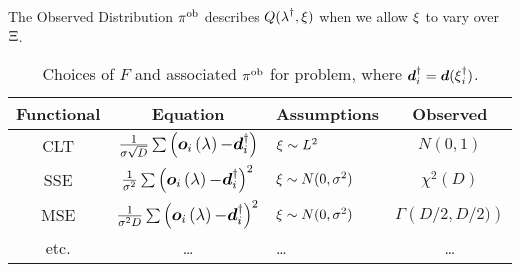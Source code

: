 \begin{block}{The Observed Distribution}
\centering
\Large
    $\operatorname*{\pi^{ob}}$ describes $Q(\operatorname*{\lambda}^\dagger, \operatorname*{\xi})$ when we allow $\operatorname*{\xi}$ to vary over $\operatorname*{\Xi}$.
\vspace{1cm}
    \begin{table}
      \centering
      \begin{tabular}{c c l c}
        \textbf{Functional} & \textbf{Equation} & \textbf{Assumptions} & \bf{Observed} \\
        \midrule
        CLT & $\frac{1}{\sigma\sqrt{D}} \large\sum \left( \boldsymbol{o}_i\operatorname*{\left ( \operatorname*{\lambda} \right )} - \boldsymbol{d}_i^\dagger \right)$ & $\operatorname*{\xi} \sim L^2$ & $N(0,1)$ \\
        SSE &  $\frac{1}{\sigma^2} \large\sum \left ( \boldsymbol{o}_i\operatorname*{\left ( \operatorname*{\lambda} \right )} - \boldsymbol{d}_i^\dagger \right)^2$ & $\operatorname*{\xi} \sim N(0,\sigma^2)$ & $\chi^2 (D)$ \\
        MSE & $\frac{1}{\sigma^2 D} \large\sum \left ( \boldsymbol{o}_i\operatorname*{\left ( \operatorname*{\lambda} \right )} - \boldsymbol{d}_i^\dagger \right)^2$ & $\operatorname*{\xi} \sim N(0,\sigma^2)$ & $\Gamma \left ( D/2, D/2) \right )$ \\
        etc. & \dots & \dots & \dots \\
        \bottomrule
      \end{tabular}
      \caption{\large Choices of $F$ and associated $\operatorname*{\pi^{ob}}$ for problem, where $\boldsymbol{d}_i^\dagger = \boldsymbol{d}(\operatorname*{\xi}_i^\dagger)$.}
    \end{table}

\end{block}
\vspace{-1cm}
